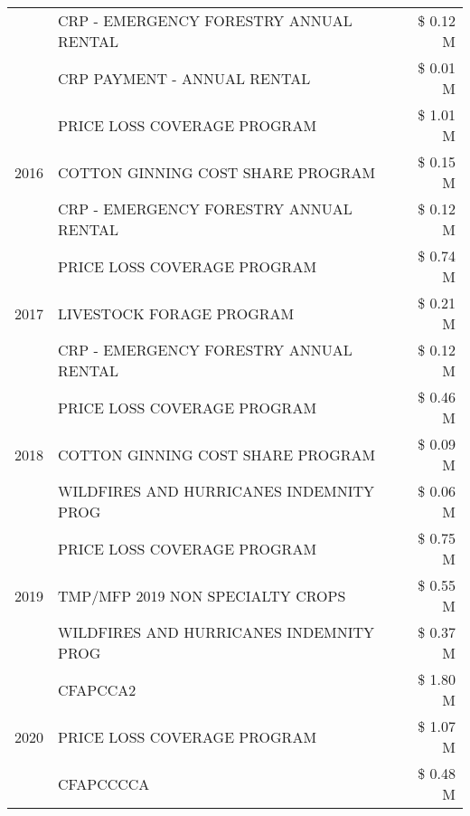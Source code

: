 \begin{tabular}{llr}
 & CRP - EMERGENCY FORESTRY ANNUAL RENTAL & \$ 0.12 M \\
 & CRP PAYMENT - ANNUAL RENTAL & \$ 0.01 M \\
\cline{1-3}
\multirow[t]{3}{*}{2016} & PRICE LOSS COVERAGE PROGRAM & \$ 1.01 M \\
 & COTTON GINNING COST SHARE PROGRAM & \$ 0.15 M \\
 & CRP - EMERGENCY FORESTRY ANNUAL RENTAL & \$ 0.12 M \\
\cline{1-3}
\multirow[t]{3}{*}{2017} & PRICE LOSS COVERAGE PROGRAM & \$ 0.74 M \\
 & LIVESTOCK FORAGE PROGRAM & \$ 0.21 M \\
 & CRP - EMERGENCY FORESTRY ANNUAL RENTAL & \$ 0.12 M \\
\cline{1-3}
\multirow[t]{3}{*}{2018} & PRICE LOSS COVERAGE PROGRAM & \$ 0.46 M \\
 & COTTON GINNING COST SHARE PROGRAM & \$ 0.09 M \\
 & WILDFIRES AND HURRICANES INDEMNITY PROG & \$ 0.06 M \\
\cline{1-3}
\multirow[t]{3}{*}{2019} & PRICE LOSS COVERAGE PROGRAM & \$ 0.75 M \\
 & TMP/MFP 2019 NON SPECIALTY CROPS & \$ 0.55 M \\
 & WILDFIRES AND HURRICANES INDEMNITY PROG & \$ 0.37 M \\
\cline{1-3}
\multirow[t]{3}{*}{2020} & CFAPCCA2 & \$ 1.80 M \\
 & PRICE LOSS COVERAGE PROGRAM & \$ 1.07 M \\
 & CFAPCCCCA & \$ 0.48 M \\
\cline{1-3}
\bottomrule
\end{tabular}
